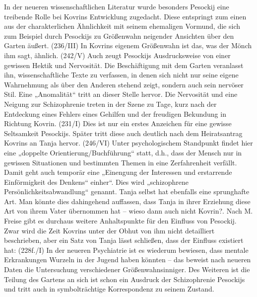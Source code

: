 \documentclass{../../sem_paper}
\begin{document}
In der neueren wissenschaftlichen Literatur wurde besonders Pesockij eine treibende Rolle bei
Kovrins Entwicklung zugedacht.\autocite{freise91} Diese entspringt zum einen aus der charakterlichen Ähnlichkeit
mit seinem ehemaligen Vormund, die sich zum Beispiel durch Pesockijs zu Größenwahn neigender
Ansichten über den Garten äußert. (236/III) In Kovrins eigenem Größenwahn ist das, was
der Mönch ihm sagt, ähnlich. (242/V) Auch zeugt Pesockijs
Ausdrucksweise von einer gewissen Hektik und Nervosität.\autocite[93]{freise91} Die Beschäftigung mit dem Garten
veranlasst ihn, wissenschaftliche Texte zu verfassen, in denen sich nicht nur seine eigene
Wahrnehmung als über den Anderen stehend zeigt, sondern auch sein nervöser Stil. Eine
„Anomalität“ tritt an dieser Stelle hervor.\autocite[90]{freise91} Die Nervosität und eine Neigung zur Schizophrenie
treten in der Szene zu Tage, kurz nach der Entdeckung eines Fehlers eines Gehilfen und der
freudigen Bekundung in Richtung Kovrin. (231/I) Dies ist nur ein erstes
Anzeichen für eine gewisse Seltsamkeit Pesockijs. Später tritt diese auch deutlich nach dem
Heiratsantrag Kovrins an Tanja hervor. (246/VI)
Unter psychologischem Standpunkt findet hier eine 
„doppelte Orientierung/Buchführung“\autocite[61]{avenarius} statt,
d.h., dass der Mensch nur in gewissen Situationen und bestimmten Themen in eine Zerfahrenheit
verfällt. Damit geht auch temporär eine „Einengung der Interessen und erstarrende Einförmigkeit
des Denkens“ einher“\autocite[64]{avenarius}. Dies wird „schizophrene Persönlichkeitsabwandlung“ genannt. Tanja selbst
hat ebenfalls eine sprunghafte Art. Man könnte dies dahingehend auffassen, dass Tanja in ihrer
Erziehung diese Art von ihrem Vater übernommen hat -- wieso dann auch nicht Kovrin?. Nach M.
Freise gibt es durchaus weitere Anhaltspunkte für den Einfluss von Pesockij. Zwar wird die Zeit
Kovrins unter der Obhut von ihm nicht detailliert beschrieben, aber ein Satz von Tanja lässt
schließen, dass der Einfluss existiert hat: (228f./I) In der neueren Psychiatrie ist es wiederum bewiesen, dass mentale Erkrankungen
Wurzeln in der Jugend haben könnten -- das beweist nach neueren Daten die Untersuchung
verschiedener Größenwahnsinniger.\autocite[10]{avenarius} Des Weiteren ist die Teilung des Gartens an sich ist schon ein
Ausdruck der Schizophrenie Pesockijs und tritt auch in symbolträchtige Korrespondenz zu seinem
Zustand.\autocite{freise91}
\end{document}
